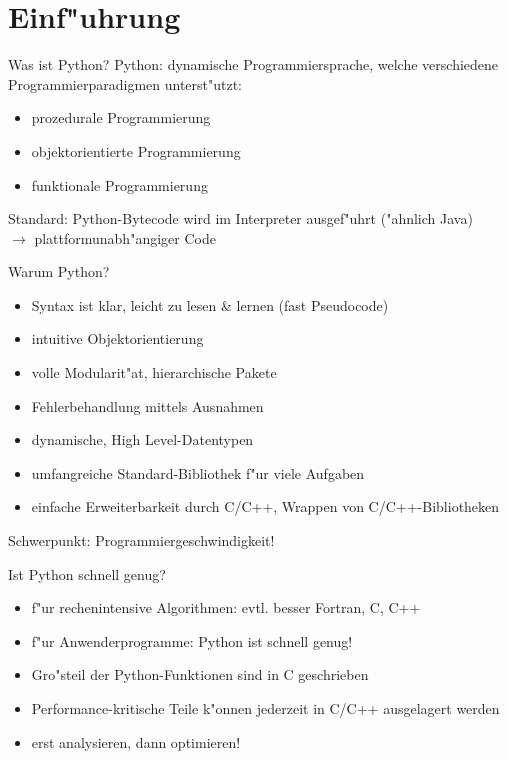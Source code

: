 \section{Einf"uhrung}

\begin{frame}{Was ist Python?}
\alert{Python:} dynamische Programmiersprache, welche verschiedene Programmierparadigmen unterst"utzt:
\begin{itemize}
\item prozedurale Programmierung
\item objektorientierte Programmierung
\item funktionale Programmierung
\end{itemize}
Standard: Python-Bytecode wird im Interpreter ausgef"uhrt ("ahnlich Java)\\
$\rightarrow$ \alert{plattformunabh"angiger Code}
\end{frame}

\begin{frame}{Warum Python?}
\begin{itemize}
\item Syntax ist klar, leicht zu lesen \& lernen (fast Pseudocode)
\item intuitive Objektorientierung
\item volle Modularit"at, hierarchische Pakete
\item Fehlerbehandlung mittels Ausnahmen
\item dynamische, \glqq High Level\grqq-Datentypen
\item umfangreiche Standard-Bibliothek f"ur viele Aufgaben
\item einfache Erweiterbarkeit durch C/C++, Wrappen von C/C++-Bibliotheken
\end{itemize}
\alert{Schwerpunkt: Programmiergeschwindigkeit!}
\end{frame}

\begin{frame}{Ist Python schnell genug?}
\begin{itemize}
\item f"ur rechenintensive Algorithmen: evtl. besser Fortran, C, C++ 
\item f"ur Anwenderprogramme: Python ist schnell genug!
\item Gro"steil der Python-Funktionen sind in C geschrieben
\item Performance-kritische Teile k"onnen jederzeit in C/C++ ausgelagert werden
\item erst analysieren, dann optimieren!
\end{itemize}
\end{frame}

